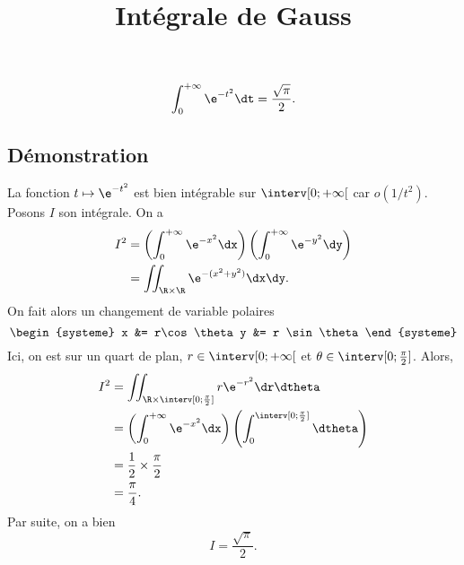\documentclass[fontsize=12pt,twoside=false,parskip=half]{scrartcl}
\title{Intégrale de Gauss}
\date{}
\author{}
\begin{document}
\maketitle
   \begin{Theoreme}
      \[
         \int_0^{+\infty} \e^{-t^2} \dt = \frac{\sqrt{\pi}}{2}.
      \]
   \end{Theoreme}
   \subsection{Démonstration}
      La fonction $t \mapsto \e^{-t^2}$ est bien intégrable sur $\interv[0; +\infty[$ car $o(1/t^2)$.
      Posons $I$ son intégrale. On a 
      \begin{align*}
         I^2 &= \left( \int_0^{+\infty} \e^{-x^2} \dx \right) \left( \int_0^{+\infty} \e^{-y^2} \dy \right) \\
             &= \iint_{\R \times \R} \e^{-(x^2 + y^2)} \dx \dy.
      \end{align*}
      On fait alors un changement de variable polaires
      \[
         \begin{systeme}
            x &= r\cos \theta
            y &= r \sin \theta
         \end{systeme}
      \]
      Ici, on est sur un quart de plan, $r \in \interv[0; +\infty[$ et $\theta \in \interv[0; \frac{\pi}{2}]$. Alors,
      \begin{align*}
         I^2 &= \iint_{\R \times \interv[0; \frac{\pi}{2}]} r \e^{-r^2} \dr \dtheta\\
             &= \left( \int_0^{+\infty} \e^{-x^2} \dx \right) \left( \int_0^{\interv[0; \frac{\pi}{2}]} \dtheta \right)\\
             &= \frac{1}{2} \times \frac{\pi}{2}\\
             &= \frac{\pi}{4}.
      \end{align*}
      Par suite, on a bien
      \[
         I = \frac{\sqrt{\pi}}{2}.
      \]
\end{document}
